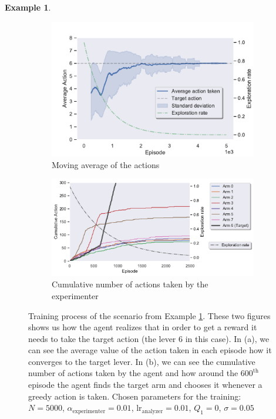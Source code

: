 \documentclass[11pt,a4paper,twoside]{report}
\newcommand{\+}{\textnormal{+} }
\theoremstyle{definition}
\newtheorem{myex}[mythm]{Example}
\numberwithin{equation}{chapter}
\begin{document}
  \begin{myex}\label{MAB1ex}

    \begin{figure}[]
      \centering
      \begin{subfigure}{.5\textwidth}
        \centering
        \includegraphics[width=1\linewidth]{figures/Actions-MAB1.pdf}
        \caption{Moving average of the actions}
        \label{fig:ActionAverageMAB1}
      \end{subfigure}%
      \begin{subfigure}{.5\textwidth}
        \centering
        \includegraphics[width=1\linewidth]{figures/Cum-action-MAB1.pdf}
        \caption{Cumulative number of actions taken by the experimenter}
        \label{fig:actionsMAB1}
      \end{subfigure}
      \caption{Training process of the scenario from Example \ref{MAB1ex}. These
      two figures shows us how the agent realizes that in order to get a reward
      it needs to take the target action (the lever 6 in this case). In (a), we
      can see the average value of the action taken in each episode how it
      converges to the target lever. In (b), we can see the cumulative number of
      actions taken by the agent and how around the $600^\text{th}$ episode the
      agent finds the target arm and chooses it whenever a greedy action is
      taken. Chosen parameters for the training: $N=5000$,
      $\alpha_\text{experimenter}=0.01$, $\text{lr}_\text{analyzer}=0.01$,
      $Q_1=0$, $\sigma=0.05$}
    \end{figure}  




\end{myex}
\end{document}
